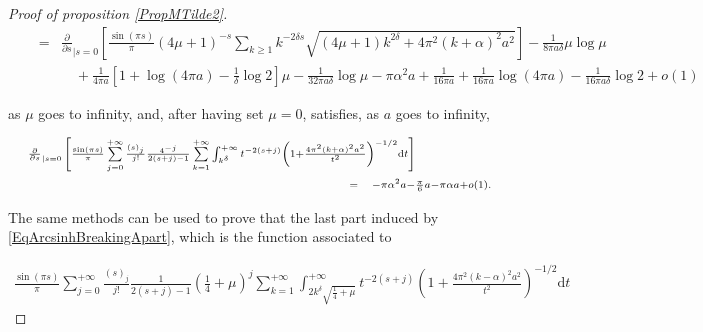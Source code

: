 \documentclass{jams-l}
\theoremstyle{definition}
\theoremstyle{remark}
\numberwithin{equation}{section}
\begin{document}
\begin{proof}[Proof of proposition \ref{PropMTilde2}]
\[{\begin{array}{lll}
                                \quad & \scriptstyle = & \scriptstyle \frac{\partial}{\partial s}_{\left \vert s = 0 \right.} \left[ \frac{\sin \left( \pi s \right)}{\pi} \left( 4 \mu + 1 \right)^{-s} \sum\limits_{k \geqslant 1} k^{-2 \delta s} \sqrt{\left( 4 \mu + 1 \right) k^{2 \delta} + 4 \pi^2 \left( k + \alpha \right)^2 a^2} \right] - \frac{1}{8 \pi a \delta} \mu \log \mu \\[1em]
                                
                                && \scriptstyle \quad + \frac{1}{4 \pi a} \left[ 1 + \log \left( 4 \pi a \right) - \frac{1}{\delta} \log 2 \right] \mu - \frac{1}{32 \pi a \delta} \log \mu - \pi \alpha^2 a + \frac{1}{16 \pi a} + \frac{1}{16 \pi a} \log \left( 4 \pi a \right) - \frac{1}{16 \pi a \delta} \log 2 + o \left( 1 \right)
                            \end{array}} \]
                        
                        \noindent as $\mu$ goes to infinity, and, after having set $\mu = 0$, satisfies, as $a$ goes to infinity,
                        
                        \[\begin{array}{lll}
                                \multicolumn{3}{l}{\scriptstyle \frac{\partial}{\partial s}_{\left \vert s = 0 \right.} \left[ \frac{\sin \left( \pi s \right)}{\pi} \sum\limits_{j = 0}^{+\infty} \frac{\left( s \right)_j}{j!} \frac{4^{-j}}{2 \left( s + j \right) - 1} \sum\limits_{k = 1}^{+\infty} \int_{k^{\delta}}^{+ \infty} t^{- 2 \left( s + j \right)} \left( 1 + \frac{4 \pi^2 \left( k + \alpha \right)^2 a^2}{t^2} \right)^{-1/2} \mathrm{d}t \right]} \\[1em]
                                
                                \qquad \qquad \qquad \qquad \qquad \qquad \qquad \qquad \qquad \qquad \qquad & \scriptstyle = & \scriptstyle - \pi \alpha^2 a - \frac{\pi}{6} a - \pi \alpha a + o \left( 1 \right).
                            \end{array} \]
                        
                        \noindent The same methods can be used to prove that the last part induced by \eqref{EqArcsinhBreakingApart}, which is the function associated to
                        
                        \[ \begin{array}{c}
                                \frac{\sin \left( \pi s \right)}{\pi} \sum\limits_{j = 0}^{+\infty} \frac{\left( s \right)_j}{j!} \frac{1}{2 \left( s + j \right) - 1} \left( \frac{1}{4} + \mu \right)^j \sum\limits_{k = 1}^{+\infty} \int_{2 k^{\delta} \sqrt{\frac{1}{4} + \mu}}^{+ \infty} t^{- 2 \left( s + j \right)} \left( 1 + \frac{4 \pi^2 \left( k - \alpha \right)^2 a^2}{t^2} \right)^{-1/2} \mathrm{d}t
                            \end{array} \]
                        

\end{proof}
\end{document}
